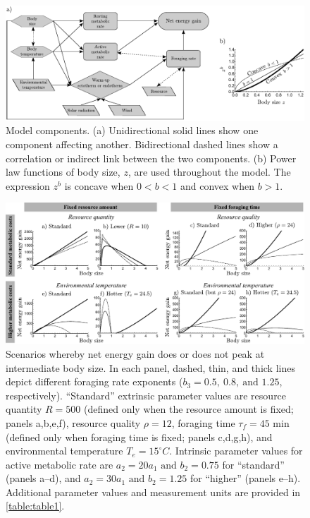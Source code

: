 \clearpage

\begin{figure}
\includegraphics[width=\textwidth]{fig1}
\caption{
    \setstretch{\stretchby}
    Model components.
    (a) Unidirectional solid lines show one component affecting another.
    Bidirectional dashed lines show a correlation or indirect link between the two components.
    (b) Power law functions of body size, $z$, are used throughout the model.
    The expression $z^b$ is concave when $0 < b < 1$ and convex when $b > 1$.
}
\label{fig1}
\end{figure}

\clearpage

\begin{figure}
\includegraphics[width=\textwidth]{fig2}
\caption{
    \setstretch{\stretchby}
    Scenarios whereby net energy gain does or does not peak at intermediate body size.
    In each panel, dashed, thin, and thick lines depict different foraging rate exponents ($b_3 = 0.5,\ 0.8,\ \text{and } 1.25$, respectively).
    ``Standard'' extrinsic parameter values are 
    resource quantity $R = 500$ (defined only when the resource amount is fixed; panels a,b,e,f),
    resource quality $\rho = 12$,
    foraging time $\tau_f = 45 \text{ min}$ (defined only when foraging time is fixed; panels c,d,g,h), 
    and environmental temperature $T_e = 15^\circ C$.
    Intrinsic parameter values for active metabolic rate are $a_2 = 20 a_1 \text{ and } b_2 = 0.75$ for ``standard'' (panels a--d), and $a_2 = 30 a_1 \text{ and } b_2  = 1.25$ for ``higher'' (panels e--h).
    Additional parameter values and measurement units are provided in \cref{table:table1}.
}
\label{fig2}
\end{figure}

